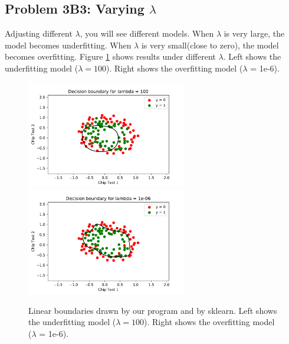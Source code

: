 \documentclass[]{book}
\theoremstyle{definition}
\begin{document}
\subsection*{Problem 3B3: Varying $\lambda$}
Adjusting different $\lambda$, you will see different models. When $\lambda$ is very large, the model becomes underfitting. When $\lambda$ is very small(close to zero), the model becomes overfitting. Figure \ref{fig:Overfit_Underfit} shows results under different $\lambda$. Left shows the underfitting model ($\lambda = 100$). Right shows the overfitting model ($\lambda$ = 1e-6).
\begin{figure}[H]
	\centering
	\includegraphics[width=7cm]{imgs//underfitting.pdf}
	\includegraphics[width=7cm]{imgs//overfitting.pdf}
	\caption{Linear boundaries drawn by our program and by sklearn. Left shows the underfitting model ($\lambda = 100$). Right shows the overfitting model ($\lambda$ = 1e-6).}
	\label{fig:Overfit_Underfit}
\end{figure}
\end{document}
